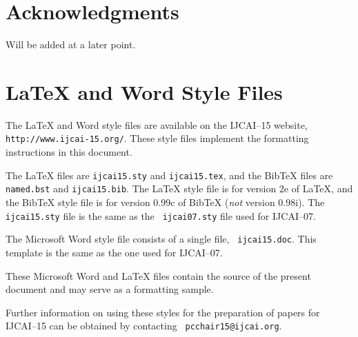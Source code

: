 \documentclass{article}
\begin{document}
\section*{Acknowledgments}

Will be added at a later point.


\appendix

\section{\LaTeX{} and Word Style Files}\label{stylefiles}

The \LaTeX{} and Word style files are available on the IJCAI--15
website, {\tt http://www.ijcai-15.org/}.
These style files implement the formatting instructions in this
document.

The \LaTeX{} files are {\tt ijcai15.sty} and {\tt ijcai15.tex}, and
the Bib\TeX{} files are {\tt named.bst} and {\tt ijcai15.bib}. The
\LaTeX{} style file is for version 2e of \LaTeX{}, and the Bib\TeX{}
style file is for version 0.99c of Bib\TeX{} ({\em not} version
0.98i). The {\tt ijcai15.sty} file is the same as the {\tt
ijcai07.sty} file used for IJCAI--07.

The Microsoft Word style file consists of a single file, {\tt
ijcai15.doc}. This template is the same as the one used for
IJCAI--07.

These Microsoft Word and \LaTeX{} files contain the source of the
present document and may serve as a formatting sample.  

Further information on using these styles for the preparation of
papers for IJCAI--15 can be obtained by contacting {\tt
pcchair15@ijcai.org}.



\end{document}
